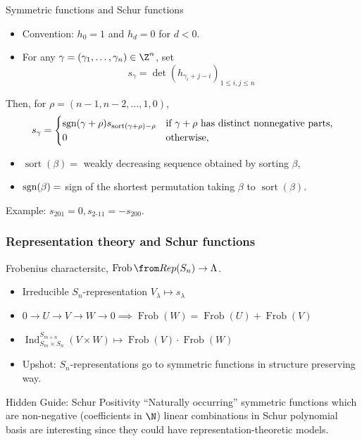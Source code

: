 \documentclass[dvipsnames]{beamer}
\DeclareMathOperator{\Ind}{Ind}
\newcommand{\sgn}{\text{\rm sgn}}
\DeclareMathOperator{\sort}{sort}
\theoremstyle{definition}
\begin{document}
\begin{frame}{Symmetric functions and Schur functions}
  \begin{itemize}
  \item Convention: \(h_0 = 1\) and \(h_d = 0\) for \(d < 0\).
  \item For any \(\gamma = (\gamma_1,\ldots,\gamma_n) \in \Z^n \), set
    \[
      s_\gamma =  \det(h_{\gamma_i+j-i})_{1 \leq i,j
        \leq n}
    \] \pause
  \end{itemize}
  Then, for \(\rho = (n-1,n-2, \ldots, 1,0)\),
  \[
    s_\gamma = 
\begin{cases}
\sgn(\gamma+\rho) s_{\sort(\gamma+\rho) -\rho} & \text{if $\gamma +
                                                 \rho$ has distinct
                                                 nonnegative parts,}\\
0                                                          & \text{otherwise,}
\end{cases}
  \]
\begin{itemize}
\item $\sort(\beta) = $ weakly decreasing sequence obtained by sorting $\beta$,
\vspace{-1mm}
\item $\sgn(\beta) =$ sign of the shortest permutation taking $\beta$ to $\sort(\beta)$.
\end{itemize} \pause
Example: \(s_{201} = 0, s_{2\text{-}11} = -s_{200}\).
\end{frame}
\begin{frame}
  \frametitle{Representation theory and Schur functions}
  Frobenius charactersitc, \(\operatorname{Frob}\from Rep(S_n) \to \Lambda\). \pause
    \begin{itemize}
    \item Irreducible \(S_n\)-representation
      \(V_\lambda \mapsto s_\lambda\) \pause
    \item \(0 \to U \to V \to W \to 0 \implies \operatorname{Frob}(W) = \operatorname{Frob}(U)+\operatorname{Frob}(V)\)\pause
    \item \(\Ind_{S_m \times S_n}^{S_{m+n}} (V \times W) \mapsto
      \operatorname{Frob}(V) \cdot \operatorname{Frob}(W)\) \pause
    \item Upshot: \(S_n\)-representations go to symmetric functions in
    structure preserving way. \pause
    \end{itemize}
  \begin{block}{Hidden Guide: Schur Positivity}
    ``Naturally occurring'' symmetric functions which are non-negative
    (coefficients in \(\N\))
    linear combinations in Schur polynomial basis
     are interesting since they could have representation-theoretic models.
  \end{block}
\end{frame}
\end{document}
